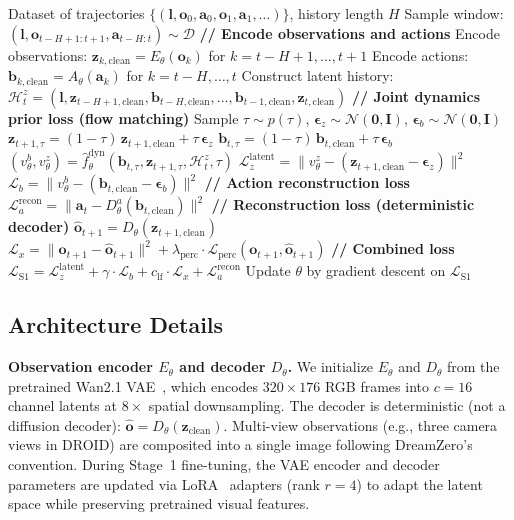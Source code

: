 \documentclass{article}
\newcommand{\vo}{\bm{o}}
\newcommand{\vz}{\bm{z}}
\newcommand{\va}{\bm{a}}
\newcommand{\vb}{\bm{b}}
\newcommand{\vep}{\bm{\epsilon}}
\newcommand{\loss}{\mathcal{L}}
\begin{document}
\begin{algorithm}[t]
\caption{Stage 1: Training AC-UL with Joint Dynamics Prior}
\label{alg:stage1}
\begin{algorithmic}[1]
\REQUIRE Dataset of trajectories $\{(\bm{l}, \vo_0, \va_0, \vo_1, \va_1, \ldots)\}$, history length $H$
\STATE Sample window: $(\bm{l}, \vo_{t-H+1:t+1}, \va_{t-H:t}) \sim \mathcal{D}$
\STATE \textbf{// Encode observations and actions}
\STATE Encode observations: $\vz_{k,\text{clean}} = E_\theta(\vo_k)$ for $k = t{-}H{+}1, \ldots, t{+}1$
\STATE Encode actions: $\vb_{k,\text{clean}} = A_\theta(\va_k)$ for $k = t{-}H, \ldots, t$
\STATE Construct latent history: $\mathcal{H}_t^z = (\bm{l}, \vz_{t-H+1,\text{clean}}, \vb_{t-H,\text{clean}}, \ldots, \vb_{t-1,\text{clean}}, \vz_{t,\text{clean}})$
\STATE \textbf{// Joint dynamics prior loss (flow matching)}
\STATE Sample $\tau \sim p(\tau)$, $\vep_z \sim \mathcal{N}(\bm{0}, \bm{I})$, $\vep_b \sim \mathcal{N}(\bm{0}, \bm{I})$
\STATE $\vz_{t+1,\tau} = (1-\tau)\,\vz_{t+1,\text{clean}} + \tau\,\vep_z$ \hfill {}
\STATE $\vb_{t,\tau} = (1-\tau)\,\vb_{t,\text{clean}} + \tau\,\vep_b$
\STATE $(v_\theta^b, v_\theta^z) = \hat{f}_\theta^{\text{dyn}}(\vb_{t,\tau}, \vz_{t+1,\tau}, \mathcal{H}_t^z, \tau)$ \hfill {}
\STATE $\loss_z^{\text{latent}} = \|v_\theta^z - (\vz_{t+1,\text{clean}} - \vep_z)\|^2$
\STATE $\loss_b = \|v_\theta^b - (\vb_{t,\text{clean}} - \vep_b)\|^2$
\STATE \textbf{// Action reconstruction loss}
\STATE $\loss_a^{\text{recon}} = \|\va_t - D_\theta^a(\vb_{t,\text{clean}})\|^2$
\STATE \textbf{// Reconstruction loss (deterministic decoder)}
\STATE $\hat{\vo}_{t+1} = D_\theta(\vz_{t+1,\text{clean}})$
\STATE $\loss_x = \|\vo_{t+1} - \hat{\vo}_{t+1}\|^2 + \lambda_{\text{perc}} \cdot \loss_{\text{perc}}(\vo_{t+1}, \hat{\vo}_{t+1})$
\STATE \textbf{// Combined loss}
\STATE $\loss_{\text{S1}} = \loss_z^{\text{latent}} + \gamma \cdot \loss_b + c_{\text{lf}} \cdot \loss_x + \loss_a^{\text{recon}}$
\STATE Update $\theta$ by gradient descent on $\loss_{\text{S1}}$
\end{algorithmic}
\end{algorithm}

\subsection{Architecture Details}
\label{sec:architecture}

\textbf{Observation encoder $E_\theta$ and decoder $D_\theta$.}
We initialize $E_\theta$ and $D_\theta$ from the pretrained Wan2.1 VAE~\citep{wan2025}, which encodes $320 \times 176$ RGB frames into $c = 16$ channel latents at $8\times$ spatial downsampling.
The decoder is deterministic (not a diffusion decoder): $\hat{\vo} = D_\theta(\vz_{\text{clean}})$.
Multi-view observations (e.g., three camera views in DROID) are composited into a single image following DreamZero's convention.
During Stage~1 fine-tuning, the VAE encoder and decoder parameters are updated via LoRA~\citep{hu2022lora} adapters (rank $r = 4$) to adapt the latent space while preserving pretrained visual features.
\end{document}

